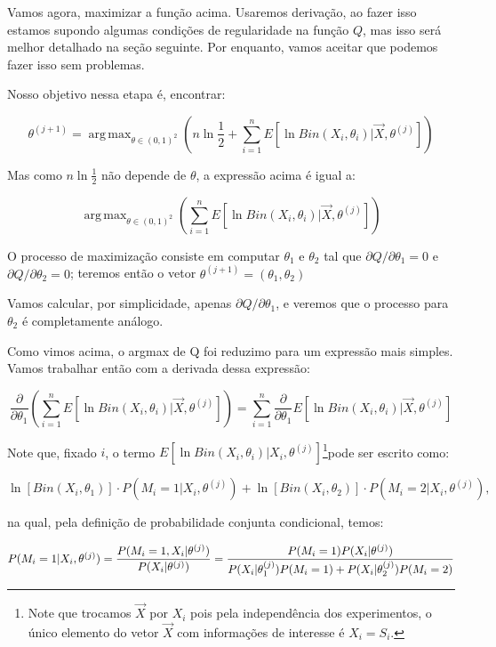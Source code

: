 \documentclass[12pt]{article}
\DeclareMathOperator*{\argmax}{arg\,max} %
\begin{document}
Vamos agora, maximizar a função acima. Usaremos derivação, ao fazer isso estamos supondo algumas condições de regularidade na função $Q$, mas isso será melhor detalhado na seção seguinte. Por enquanto, vamos aceitar que podemos fazer isso sem problemas.

Nosso objetivo nessa etapa é, encontrar:

$$\theta^{(j+1)}=\argmax_{\theta\in(0,1)^2}\left(n\ln\frac12+\sum_{i=1}^nE[\ln Bin(X_i,\theta_i)|\vec X,\theta^{(j)}]\right)$$

Mas como $n\ln\frac12$ não depende de $\theta$, a expressão acima é igual a:

$$\argmax_{\theta\in(0,1)^2}\left(\sum_{i=1}^nE[\ln Bin(X_i,\theta_i)|\vec X,\theta^{(j)}]\right)$$

O processo de maximização consiste em computar $\theta_1$ e $\theta_2$ tal que $\partial Q/\partial \theta_1 =0$
e $\partial Q/\partial \theta_2 =0$; teremos então o vetor $\theta^{(j+1)}=(\theta_1,\theta_2)$

Vamos calcular, por simplicidade, apenas $\partial Q/\partial \theta_1$, e veremos que o processo para $\theta_2$ é completamente análogo.

Como vimos acima, o argmax de Q foi reduzimo para um expressão mais simples. Vamos trabalhar então com a derivada dessa expressão:

$$\dfrac{\partial}{\partial \theta_1}\left(\sum_{i=1}^nE[\ln Bin(X_i,\theta_i)|\vec X,\theta^{(j)}]\right)=\sum_{i=1}^n\dfrac{\partial}{\partial \theta_1}E[\ln Bin(X_i,\theta_i)|\vec X,\theta^{(j)}]$$

Note que, fixado $i$, o termo $E[\ln Bin(X_i,\theta_i)|X_i,\theta^{(j)}]$\footnote{Note que trocamos $\vec X$ por $X_i$ pois pela independência dos experimentos, o único elemento do vetor $\vec X$ com informações de interesse é $X_i=S_i$.}pode ser escrito como:

\begin{equation}
    \label{eqn:deriv}
\ln[Bin(X_i,\theta_1)]\cdot P(M_i=1|X_i,\theta^{(j)})+\ln[Bin(X_i,\theta_2)]\cdot P(M_i=2|X_i,\theta^{(j)}),\end{equation}


na qual, pela definição de probabilidade conjunta condicional, temos:

$P(M_i=1|X_i,\theta^{(j)})=\dfrac{P(M_i=1,X_i|\theta^{(j)})}{P(X_i|\theta^{(j)})}=\\
\dfrac{P(M_i=1)P(X_i|\theta^{(j)})}{P(X_i|\theta_1^{(j)})P(M_i=1)+P(X_i|\theta_2^{(j)})P(M_i=2)}$
\end{document}
